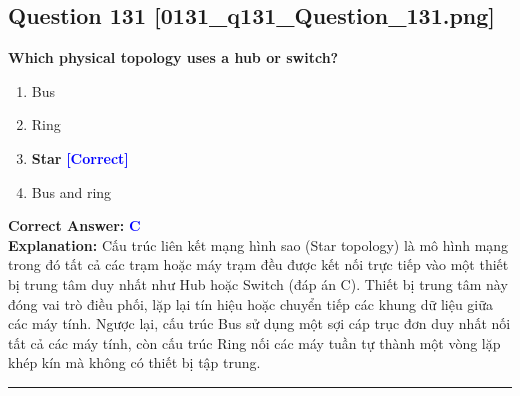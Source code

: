 \documentclass[11pt,a4paper]{article}
\begin{document}
\begin{minipage}{\textwidth}
\subsection*{Question 131 \quad \footnotesize{[0131\_q131\_Question\_131.png]}}
\noindent \textbf{Which physical topology uses a hub or switch?}

\begin{enumerate}[label=\Alph*.]
    \item Bus
    \item Ring
    \item \textbf{Star} \hfill \textcolor{blue}{\textbf{[Correct]}}
    \item Bus and ring
\end{enumerate}

\noindent \textbf{Correct Answer:} \textcolor{blue}{\textbf{C}} \\[2pt]
\noindent \textbf{Explanation:} Cấu trúc liên kết mạng hình sao (Star topology) là mô hình mạng trong đó tất cả các trạm hoặc máy trạm đều được kết nối trực tiếp vào một thiết bị trung tâm duy nhất như Hub hoặc Switch (đáp án C). Thiết bị trung tâm này đóng vai trò điều phối, lặp lại tín hiệu hoặc chuyển tiếp các khung dữ liệu giữa các máy tính. Ngược lại, cấu trúc Bus sử dụng một sợi cáp trục đơn duy nhất nối tất cả các máy tính, còn cấu trúc Ring nối các máy tuần tự thành một vòng lặp khép kín mà không có thiết bị tập trung.

\par\vspace{0.3cm}
\hrule
\vspace{0.3cm}
\end{minipage}
\end{document}
